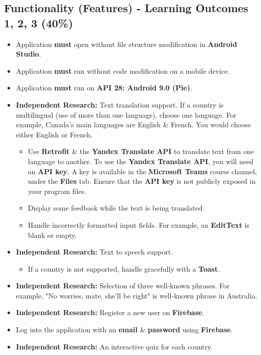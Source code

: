 \documentclass{article}
\begin{document}
\subsection*{Functionality (Features) - Learning Outcomes 1, 2, 3 (40\%)}
\begin{itemize}
	\item Application \textbf{must} open without file structure modification in \textbf{Android Studio}.
	\item Application \textbf{must} run without code modification on a mobile device.
	\item Application \textbf{must} run on \textbf{API 28: Android 9.0 (Pie)}.
	\item \textbf{Independent Research:} Text translation support. If a country is multilingual (use of more than one language), choose one language. For example, Canada's main languages are English \& French. You would choose either English or French.
	      \begin{itemize}
	      	\item Use \textbf{Retrofit} \& the \textbf{Yandex Translate API} to translate text from one language to another. To use the \textbf{Yandex Translate API}, you will need an \textbf{API key}. A key is available in the \textbf{Microsoft Teams} course channel, under the \textbf{Files} tab. Ensure that the \textbf{API key} is not publicly exposed in your program files.
	      	\item Display some feedback while the text is being translated.
	      	\item Handle incorrectly formatted input fields. For example, an \textbf{EditText} is blank or empty.
	      \end{itemize}
	\item \textbf{Independent Research:} Text to speech support.
	      \begin{itemize}
	      	\item If a country is not supported, handle gracefully with a \textbf{Toast}.
	      \end{itemize}
	\item \textbf{Independent Research:} Selection of three well-known phrases. For example, "No worries, mate, she'll be right" is well-known phrase in Australia.
	\item \textbf{Independent Research:} Register a new user on \textbf{Firebase}.
	\item Log into the application with an \textbf{email} \& \textbf{password} using \textbf{Firebase}.
	\item \textbf{Independent Research:} An interactive quiz for each country.

\end{itemize}
\end{document}

